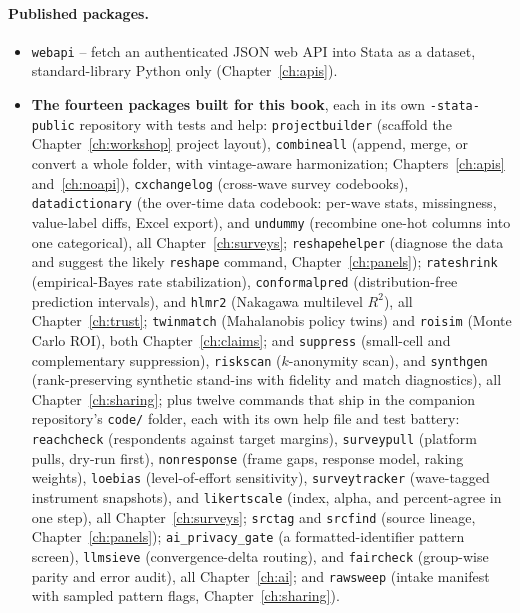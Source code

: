 \documentclass[
    a4paper,
    fontsize=10pt,
    twoside=true,
    numbers=noenddot,
]{kaobook}
\begin{document}
\paragraph{Published packages.}
\begin{itemize}
    \item \texttt{webapi} -- fetch an authenticated JSON web API into Stata as a dataset, standard-library Python only (Chapter~\ref{ch:apis}).
    \item \textbf{The fourteen packages built for this book}, each in its own \texttt{-stata-public} repository with tests and help: \texttt{projectbuilder} (scaffold the Chapter~\ref{ch:workshop} project layout), \texttt{combineall} (append, merge, or convert a whole folder, with vintage-aware harmonization; Chapters~\ref{ch:apis} and~\ref{ch:noapi}), \texttt{cxchangelog} (cross-wave survey codebooks), \texttt{datadictionary} (the over-time data codebook: per-wave stats, missingness, value-label diffs, Excel export), and \texttt{undummy} (recombine one-hot columns into one categorical), all Chapter~\ref{ch:surveys}; \texttt{reshapehelper} (diagnose the data and suggest the likely \texttt{reshape} command, Chapter~\ref{ch:panels}); \texttt{rateshrink} (empirical-Bayes rate stabilization), \texttt{conformalpred} (distribution-free prediction intervals), and \texttt{hlmr2} (Nakagawa multilevel $R^2$), all Chapter~\ref{ch:trust}; \texttt{twinmatch} (Mahalanobis policy twins) and \texttt{roisim} (Monte Carlo ROI), both Chapter~\ref{ch:claims}; and \texttt{suppress} (small-cell and complementary suppression), \texttt{riskscan} ($k$-anonymity scan), and \texttt{synthgen} (rank-preserving synthetic stand-ins with fidelity and match diagnostics), all Chapter~\ref{ch:sharing}; plus twelve commands that ship in the companion repository's \texttt{code/} folder, each with its own help file and test battery: \texttt{reachcheck} (respondents against target margins), \texttt{surveypull} (platform pulls, dry-run first), \texttt{nonresponse} (frame gaps, response model, raking weights), \texttt{loebias} (level-of-effort sensitivity), \texttt{surveytracker} (wave-tagged instrument snapshots), and \texttt{likertscale} (index, alpha, and percent-agree in one step), all Chapter~\ref{ch:surveys}; \texttt{srctag} and \texttt{srcfind} (source lineage, Chapter~\ref{ch:panels}); \texttt{ai\_privacy\_gate} (a formatted-identifier pattern screen), \texttt{llmsieve} (convergence-delta routing), and \texttt{faircheck} (group-wise parity and error audit), all Chapter~\ref{ch:ai}; and \texttt{rawsweep} (intake manifest with sampled pattern flags, Chapter~\ref{ch:sharing}).

\end{itemize}
\end{document}

